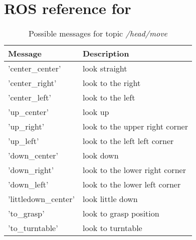 \chapter{ROS reference for \hobbit{}} \label{cha:RefROS}
\begin{table}
	\centering
	\begin{tabular}{l l}
		\toprule
		Message              & Description                    \\
		\midrule
		'center\_center'     & look straight                  \\
		'center\_right'      & look to the right              \\
		'center\_left'       & look to the left               \\
		'up\_center'         & look up                        \\
		'up\_right'          & look to the upper right corner \\
		'up\_left'           & look to the left left corner   \\
		'down\_center'       & look down                      \\
		'down\_right'        & look to the lower right corner \\
		'down\_left'         & look to the lower left corner  \\
		'littledown\_center' & look little down               \\
		'to\_grasp'          & look to grasp position         \\
		'to\_turntable'      & look to turntable              \\
		\bottomrule
	\end{tabular}
	\caption{Possible messages for topic \textit{/head/move}}
	\label{tab:headMoveCommands}
\end{table}